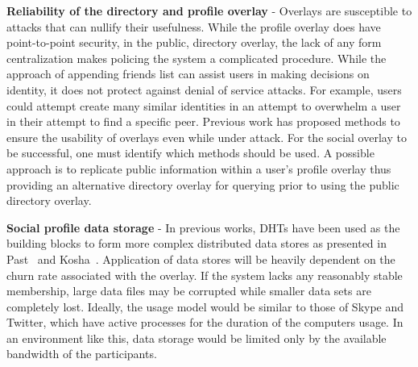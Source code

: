 {\bf Reliability of the directory and profile overlay} - Overlays are
susceptible to attacks that can nullify their usefulness.  While the profile
overlay does have point-to-point security, in the public, directory overlay,
the lack of any form centralization makes policing the system a complicated
procedure.  While the approach of appending friends list can assist users in
making decisions on identity, it does not protect against denial of service
attacks.  For example, users could attempt create many similar identities in an
attempt to overwhelm a user in their attempt to find a specific peer.  Previous
work has proposed methods to ensure the usability of overlays even while under
attack.  For the social overlay to be successful, one must identify which
methods should be used. A possible approach is to replicate public information
within a user's profile overlay thus providing an alternative directory overlay
for querying prior to using the public directory overlay.

{\bf Social profile data storage} - In previous works, DHTs have been used as
the building blocks to form more complex distributed data stores as presented
in Past~\cite{past} and Kosha~\cite{kosha}.  Application of data stores will be
heavily dependent on the churn rate associated with the overlay.  If the system
lacks any reasonably stable membership, large data files may be corrupted while
smaller data sets are completely lost.  Ideally, the usage model would be
similar to those of Skype and Twitter, which have active processes for the
duration of the computers usage.  In an environment like this, data storage
would be limited only by the available bandwidth of the participants.
